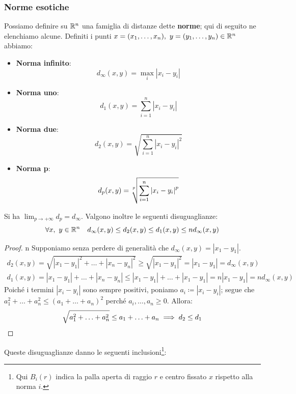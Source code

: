 \subsubsection{Norme esotiche}
Possiamo definire su $\mathbb{R}^n$ una famiglia di distanze dette \textbf{norme}; qui di seguito ne elenchiamo alcune. Definiti i punti $x=(x_1,\ldots, x_n),\ y=(y_1,\ldots, y_n)\in\mathbb{R}^n$ abbiamo:
\begin{multicols}{2}
	\begin{itemize}
	\item \textbf{Norma infinito}:
	\[d_\infty(x,y)=\max_{i}{\left|x_i-y_i\right|}\]
	\item \textbf{Norma uno}:
	\[d_1(x,y)=\sum_{i=1}^{n}\left|x_i-y_i\right|\]
\end{itemize}
\begin{itemize}
	\item \textbf{Norma due}:
	\[d_2(x,y)=\sqrt{\sum_{i=1}^{n}\left|x_i-y_i\right|^2}\]
	\item \textbf{Norma p}:
	\[d_p(x,y)=\sqrt[\leftroot{1}\uproot{3}p]{\sum_{i=1}^{n}\left|x_i-y_i\right|^p}\]
\end{itemize}
\end{multicols}
\noindent Si ha $\displaystyle \lim_{p \to +\infty}d_p=d_\infty$. Valgono inoltre le seguenti disuguaglianze:
\begin{equation*}
\forall x,\ y\in\mathbb{R}^n\quad d_\infty(x,y)\leq d_2(x,y)\leq d_1(x,y)\leq nd_\infty(x,y)
\end{equation*}
\begin{proof}{n}
Supponiamo senza perdere di generalità che $d_\infty(x,y)=\left|x_1-y_1\right|$.
\begin{gather*}
d_2(x,y)=\sqrt{\left|x_1-y_1\right|^2+\ldots+\left|x_n-y_n\right|^2}\geq\sqrt{\left|x_1-y_1\right|^2}=\left|x_1-y_1\right|=d_\infty(x,y)\\
d_1(x,y)=\left|x_1-y_1\right|+\ldots+\left|x_n-y_n\right|\leq\left|x_1-y_1\right|+\ldots+\left|x_1-y_1\right|=n\left|x_1-y_1\right|=nd_\infty(x,y)
\end{gather*}
Poiché i termini $\left|x_i-y_i\right|$ sono sempre positivi, poniamo $a_i\coloneqq\left|x_i-y_i\right|$; segue che $a_1^2+\ldots+a_n^2\leq (a_1+\ldots+a_n)^2$ perché $a_i,\ldots,a_n\geq0$. Allora:
\begin{equation*}
\sqrt{a_1^2+\ldots+a_n^2}\leq a_1+\ldots+a_n\implies d_2\leq d_1\qedhere
\end{equation*}
\end{proof}
Queste disuguaglianze danno le seguenti inclusioni\footnote{Qui $B_i\left(r\right)$ indica la palla aperta di raggio $r$ e centro fissato $x$ rispetto alla norma $i$.}:
